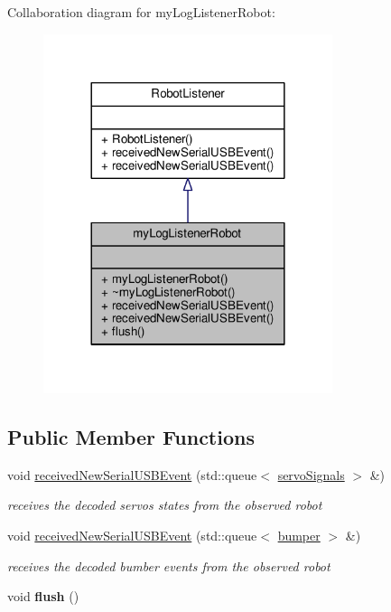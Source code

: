 Collaboration diagram for my\+Log\+Listener\+Robot\+:
\nopagebreak
\begin{figure}[H]
\begin{center}
\leavevmode
\includegraphics[width=240pt]{classmy_log_listener_robot__coll__graph}
\end{center}
\end{figure}
\subsection*{Public Member Functions}
\begin{DoxyCompactItemize}
\item 
\hypertarget{classmy_log_listener_robot_a19d65e6a5c0e14c9e08e8d1ffb23a709}{}void \hyperlink{classmy_log_listener_robot_a19d65e6a5c0e14c9e08e8d1ffb23a709}{received\+New\+Serial\+U\+S\+B\+Event} (std\+::queue$<$ \hyperlink{structservo_signals}{servo\+Signals} $>$ \&)\label{classmy_log_listener_robot_a19d65e6a5c0e14c9e08e8d1ffb23a709}

\begin{DoxyCompactList}\small\item\em receives the decoded servos states from the observed robot \end{DoxyCompactList}\item 
\hypertarget{classmy_log_listener_robot_a2fbd30aaa4a439e3d4e4b4ac812596c9}{}void \hyperlink{classmy_log_listener_robot_a2fbd30aaa4a439e3d4e4b4ac812596c9}{received\+New\+Serial\+U\+S\+B\+Event} (std\+::queue$<$ \hyperlink{structbumper}{bumper} $>$ \&)\label{classmy_log_listener_robot_a2fbd30aaa4a439e3d4e4b4ac812596c9}

\begin{DoxyCompactList}\small\item\em receives the decoded bumber events from the observed robot \end{DoxyCompactList}\item 
\hypertarget{classmy_log_listener_robot_a0e9b99ec81b173cad06d161c86cb86d8}{}void {\bfseries flush} ()\label{classmy_log_listener_robot_a0e9b99ec81b173cad06d161c86cb86d8}

\end{DoxyCompactItemize}


